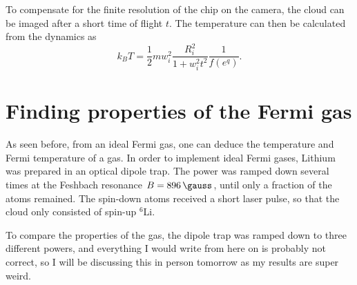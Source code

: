 To compensate for the finite resolution of the chip on the camera, the cloud can be imaged after a short time of flight $t$. The temperature can then be calculated from the dynamics as
\begin{equation}
k_BT = \frac{1}{2} mw_i^2 \frac{R_i^2}{1+w_i^2t^2}\frac{1}{f(e^q)}.
\end{equation}


	
\section{Finding properties of the Fermi gas}

As seen before, from an ideal Fermi gas, one can deduce the temperature and Fermi temperature of a gas.
In order to implement ideal Fermi gases, Lithium was prepared in an optical dipole trap. The power was ramped down several times at the Feshbach resonance $B=\SI{896}{\gauss}$, until only a fraction of the atoms remained. The spin-down atoms received a short laser pulse, so that the cloud only consisted of spin-up $^6$Li.

To compare the properties of the gas, the dipole trap was ramped down to three different powers, and everything I would write from here on is probably not correct, so I will be discussing this in person tomorrow as my results are super weird.

